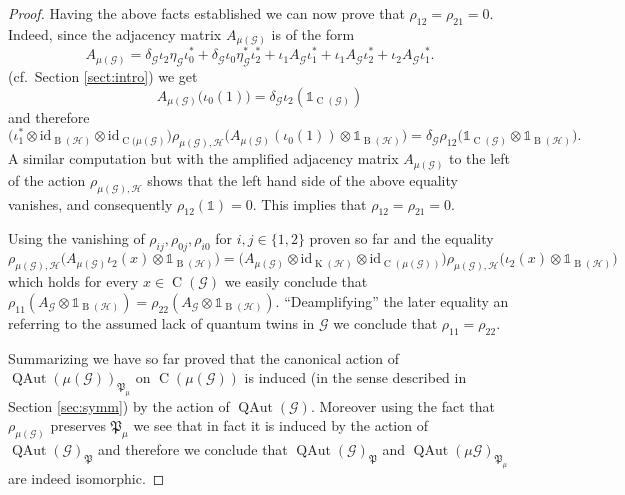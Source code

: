 \documentclass[11pt,reqno]{amsart}
\newcommand{\id}{\mathrm{id}}
\newcommand{\I}{\mathds{1}}
\DeclareMathOperator{\QAut}{QAut}
\DeclareMathOperator{\B}{B}
\DeclareMathOperator{\C}{C}
\DeclareMathOperator{\K}{K}
\begin{document}
\begin{proof}
Having the above facts established we can now prove that $\rho_{12}=\rho_{21}=0$. Indeed, since the adjacency matrix  $A_{\scriptscriptstyle\mu(\mathcal{G})}$ is of the form 
\[
A_{\scriptscriptstyle\mu(\mathcal{G})}=\delta_{\scriptscriptstyle\mathcal{G}}\iota_2\eta_{\scriptscriptstyle\mathcal{G}}\iota_0^\ast +\delta_{\scriptscriptstyle\mathcal{G}}\iota_0\eta_{\scriptscriptstyle\mathcal{G}}
^\ast\iota_2^\ast +\iota_1 A_{\scriptscriptstyle\mathcal{G}}\iota_1^\ast +\iota_1 A_{\scriptscriptstyle\mathcal{G}}\iota_2^\ast +\iota_2 A_{\scriptscriptstyle\mathcal{G}}\iota_1^\ast.
\]
(cf.~Section \ref{sect:intro}) we get  
\[
A_{\scriptscriptstyle\mu(\mathcal{G})}\bigl(\iota_0(1)\bigr)
=\delta_{\scriptscriptstyle\mathcal{G}}\iota_2(\I_{\C(\mathcal{G})})
\]
and therefore
\[
\bigl(\iota_{1}^*\otimes \id_{\B(\mathscr{H})}\otimes\id_{\C(\mu(\mathcal{G})}\bigr)
\rho_{{\scriptscriptstyle\mu(\mathcal{G}),\mathscr{H}}}
\bigl( A_{\scriptscriptstyle\mu(\mathcal{G})}(\iota_0(1))\otimes\I_{\B(\mathscr{H})}\bigr)
=\delta_{\scriptscriptstyle\mathcal{G}}\rho_{12}\bigl(\I_{\C(\mathcal{G})}\otimes\I_{\B(\mathscr{H})}\bigr).
\]
A similar computation but with the amplified adjacency matrix $A_{\scriptscriptstyle\mu(\mathcal{G})}$ to the left of the action   $\rho_{\scriptscriptstyle\mu(\mathcal{G}),\mathscr{H}}$ shows that 
the left hand side of the above equality vanishes, and consequently $\rho_{12}(\I)=0$. This implies that $\rho_{12}=\rho_{21}=0$.

Using the vanishing of $\rho_{ij},\rho_{0j},\rho_{i0}$ for $i,j\in\{1,2\}$  proven so far and the equality
\[
\rho_{{\scriptscriptstyle\mu(\mathcal{G}),\mathscr{H}}}\bigl(A_{\scriptscriptstyle\mu(\mathcal{G})}\iota_2(x)\otimes\I_{\B(\mathscr{H})}\bigr)
=\bigl(A_{\scriptscriptstyle\mu(\mathcal{G})}\otimes\id_{\K(\mathscr{H})}\otimes\id_{\C(\mu(\mathcal{G}))}\bigr) \rho_{{\scriptscriptstyle\mu(\mathcal{G}),\mathscr{H}}}\bigl(\iota_2(x)\otimes\I_{\B(\mathscr{H})}\bigr)
\]
which holds for every $x\in\C(\mathcal{G})$ we easily conclude that   $\rho_{11}(A_{\scriptscriptstyle\mathcal{G}}\otimes\I_{\B(\mathscr{H})})=\rho_{22}(A_{\scriptscriptstyle\mathcal{G}}\otimes\I_{\B(\mathscr{H})})$. ``Deamplifying'' the later  equality an referring to the assumed  lack of quantum twins in $\mathcal{G}$ we conclude that  $\rho_{11} = \rho_{22}$. 

Summarizing we have so far proved that the canonical action of $\QAut(\mu(\mathcal{G}))_{\mathfrak{P}_{\mu}}$ on $\C(\mu(\mathcal{G}))$  is induced (in the sense described in Section \ref{sec:symm}) by the action of $\QAut(\mathcal{G})$. Moreover using the fact that $\rho_{\scriptscriptstyle\mu(\mathcal{G})}$ preserves $\mathfrak{P}_{\mu}$ we see that in fact it is induced by the action of $\QAut(\mathcal{G})_{\mathfrak{P}}$ and therefore  we conclude that   $\QAut(\mathcal{G})_{\mathfrak{P}}$ and  $\QAut(\mu\mathcal{G})_{\mathfrak{P}_\mu}$ are indeed isomorphic.  
\end{proof}
\end{document}
